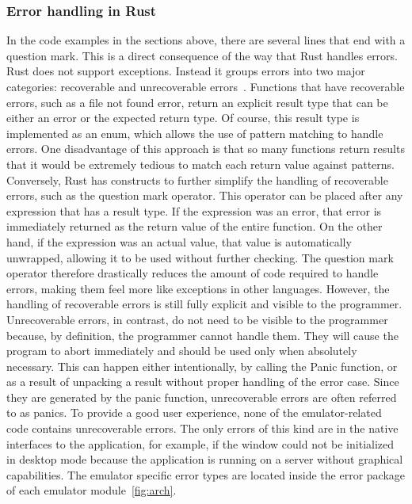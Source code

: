 \subsubsection{Error handling in Rust} \label{rust-error-handling}
In the code examples in the sections above, there are several lines that end with a question mark. This is a direct consequence of the way that Rust handles errors.
Rust does not support exceptions. Instead it groups errors into two major categories: recoverable and unrecoverable errors~\cite[Chapter~9]{klabnik2019rust}.
Functions that have recoverable errors, such as a file not found error, return an explicit result type that can be either an error or the expected return type.
Of course, this result type is implemented as an enum, which allows the use of pattern matching to handle errors.
One disadvantage of this approach is that so many functions return results that it would be extremely tedious to match each return value against patterns.
Conversely, Rust has constructs to further simplify the handling of recoverable errors, such as the question mark operator.
This operator can be placed after any expression that has a result type. If the expression was an error, that error is immediately returned as the return value of the entire function. On the other hand, if the expression was an actual value, that value is automatically unwrapped, allowing it to be used without further checking.
The question mark operator therefore drastically reduces the amount of code required to handle errors, making them feel more like exceptions in other languages. However, the handling of recoverable errors is still fully explicit and visible to the programmer.
Unrecoverable errors, in contrast, do not need to be visible to the programmer because, by definition, the programmer cannot handle them.
They will cause the program to abort immediately and should be used only when absolutely necessary.
This can happen either intentionally, by calling the Panic function, or as a result of unpacking a result without proper handling of the error case.
Since they are generated by the panic function, unrecoverable errors are often referred to as panics.
To provide a good user experience, none of the emulator-related code contains unrecoverable errors. The only errors of this kind are in the native interfaces to the application, for example, if the window could not be initialized in desktop mode because the application is running on a server without graphical capabilities.
The emulator specific error types are located inside the error package of each emulator module~\ref{fig:arch}.


